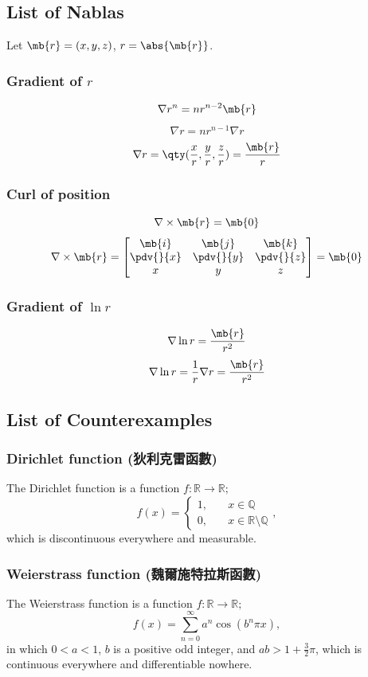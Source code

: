 \documentclass[a4paper,12pt]{report}
\begin{document}
\begin{itemize}
\begin{itemize}
\subsection{List of Nablas}
Let $\mb{r}=(x,y,z)$, $r=\abs{\mb{r}}$.
\subsubsection{Gradient of $r$}
\[\nabla r^n=nr^{n-2}\mb{r}\]
\bpr
\[\nabla r=nr^{n-1}\nabla r\]
\[\nabla r=\qty(\frac{x}{r},\frac{y}{r},\frac{z}{r})=\frac{\mb{r}}{r}\]
\epr
\subsubsection{Curl of position}
\[\nabla\times\mb{r}=\mb{0}\]
\bpr
\[\nabla\times\mb{r}=\begin{bmatrix}\mb{i}&\mb{j}&\mb{k}\\\pdv{}{x}&\pdv{}{y}&\pdv{}{z}\\x&y&z\end{bmatrix}=\mb{0}\]
\epr
\subsubsection{Gradient of $\ln r$}
\[\nabla\ln r=\frac{\mb{r}}{r^2}\]
\bpr
\[\nabla\ln r=\frac{1}{r}\nabla r=\frac{\mb{r}}{r^2}\]
\epr
\subsection{List of Counterexamples}
\subsubsection{Dirichlet function (狄利克雷函數)}
The Dirichlet function is a function $f\colon\mathbb{R}\to\mathbb{R};$
\[f(x)=\begin{cases}1,\quad & x\in\mathbb{Q}\\
0,\quad & x\in\mathbb{R}\setminus\mathbb{Q}
\end{cases},\]
which is discontinuous everywhere and measurable.
\subsubsection{Weierstrass function (魏爾施特拉斯函數)}
The Weierstrass function is a function $f\colon\mathbb{R}\to\mathbb{R};$
\[f(x)=\sum_{n=0}^{\infty}a^n\cos\left(b^n\pi x\right),\]
in which $0<a<1$, $b$ is a positive odd integer, and $ab>1+\frac{3}{2}\pi$, which is continuous everywhere and differentiable nowhere.

\end{itemize}
\end{itemize}
\end{document}
